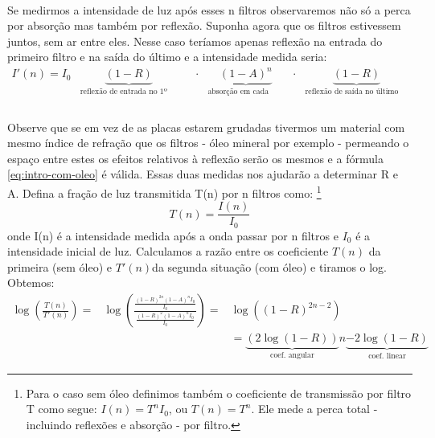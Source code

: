 \documentclass[a4paper,11pt]{article}
\begin{document}
\paragraph{}Se medirmos a intensidade de luz após esses n filtros observaremos não só a perca por absorção mas também por reflexão. Suponha agora que os filtros estivessem juntos, sem ar entre eles. Nesse caso teríamos apenas reflexão na entrada do primeiro filtro e na saída do último e a intensidade medida seria:
\begin{equation}
	\begin{array}{llllllll}
	I'(n) = I_0 & \underbrace{(1 - R)}_\textrm{reflexão de entrada no 1º filtro}& &\cdot & \underbrace{(1 - A)^n}_\textrm{absorção em cada filtro} &\cdot & \underbrace{(1 - R)}_\textrm{reflexão de saída no último filtro} \\
		\end{array}
	\label{eq:intro-com-oleo}
\end{equation} 

\paragraph{}Observe que se em vez de as placas estarem grudadas tivermos um material com mesmo índice de refração que os filtros - óleo mineral por exemplo -  permeando o espaço entre estes os efeitos relativos à reflexão serão os mesmos e a fórmula \ref{eq:intro-com-oleo} é válida.  Essas duas medidas nos ajudarão a determinar R e A. Defina a fração de luz transmitida T(n) por n filtros como:
\footnote{Para o caso sem óleo definimos também o coeficiente de transmissão por filtro T como segue: $I(n) = T^n I_0$, ou $T(n) = T^n $. Ele mede a perca total - incluindo reflexões e absorção - por filtro.}
\begin{equation}
	T(n) = \frac{I(n)}{I_0} 
\end{equation}
onde I(n) é a intensidade medida após a onda passar por n filtros e $I_0$ é a intensidade inicial de luz. Calculamos a razão entre os coeficiente $T(n)$ da primeira (sem óleo) e $T'(n)$da segunda situação (com óleo) e tiramos o log. Obtemos:
\begin{equation}
	\begin{array}{lll}
	\log \left( \frac{T(n)}{T'(n)} \right)  = &  \log \left( \frac{ \frac{(1 - R)^{2n}(1 - A)^n I_0}{I_0}}{\frac{(1 - R)^2(1 - A)^n I_0}{I_0}} \right) = &  \log \left( (1 - R)^{2n - 2} \right) \\ & & = \underbrace{(2\log (1 -R))}_\textrm{coef. angular} n \underbrace{- 2\log (1 -R)}_\textrm{coef. linear} 
		\end{array}
	\label{eq:intro-obtendo-R}
\end{equation}
\end{document}
